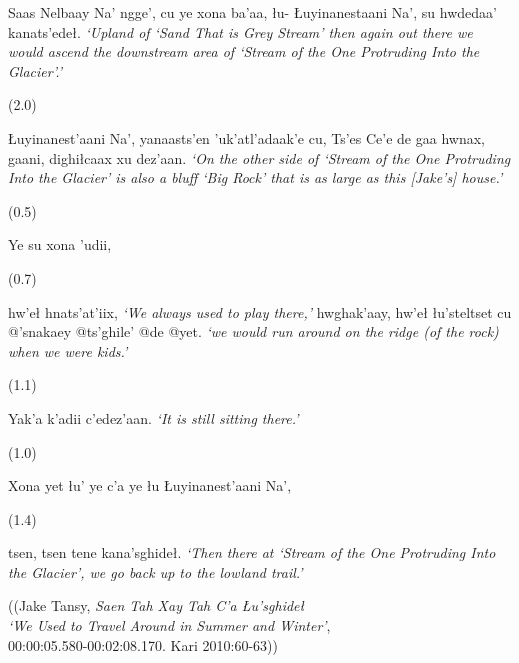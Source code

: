 \begin{exe}
\begin{xlistn}
 			Saas Nelbaay Na’ ngge’,
 			cu ye xona ba’aa,
 			łu- Łuyinanestaani Na’,
   			su hwdedaa’ kanats’edeł.
\glt \textit{‘Upland of ‘Sand That is Grey Stream’ then again out there we would ascend the downstream area of ‘Stream of the One Protruding Into the Glacier’.’}
\sn \begin{flushright}(2.0)\end{flushright}
 			Łuyinanest'aani Na’,
 			yanaasts'en ’uk’atl’adaak’e cu,
 			Ts’es Ce’e de gaa hwnax,
 			gaani,
   			dighiłcaax xu dez’aan.
\glt \textit{‘On the other side of ‘Stream of the One Protruding Into the Glacier’ is also a bluff ‘Big Rock’ that is as large as this [Jake’s] house.’}
\sn \begin{flushright}(0.5)\end{flushright}
 			Ye su xona ’udii,
\sn \begin{flushright}(0.7)\end{flushright}
   			hw’eł hnats’at’iix,
\glt \textit{‘We always used to play there,’}
 			hwghak’aay,
   			hw’eł łu’steltset cu @’snakaey @ts’ghile’ @de @yet.
\glt \textit{‘we would run around on the ridge (of the rock) when we were kids.’}
\sn \begin{flushright}(1.1)\end{flushright}
   			Yak’a k’adii c’edez’aan.
\glt \textit{‘It is still sitting there.’}
\sn \begin{flushright}(1.0)\end{flushright}
 			Xona yet łu’ ye c’a ye łu Łuyinanest'aani Na’,
\sn \begin{flushright}(1.4)\end{flushright}
 			tsen,
   			tsen tene kana’sghideł.
\glt \textit{‘Then there at ‘Stream of the One Protruding Into the Glacier’, we go back up to the lowland trail.’}

\end{xlistn}
\begin{flushright}
((Jake Tansy, \textit{Saen Tah Xay Tah C’a Łu’sghideł}\\
\textit{‘We Used to Travel Around in Summer and Winter’},\\
00:00:05.580-00:02:08.170. Kari 2010:60-63))
\end{flushright}
\end{exe}


